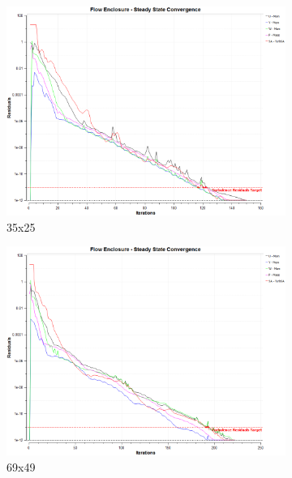 \begin{figure}[ht!]
    \centering
    \begin{subfigure}{0.48\textwidth}
        \includegraphics[width=\textwidth]{./figs/flatnx/35x25_conv.png}
        \caption{35x25}
    \end{subfigure}
    \hfill
    \begin{subfigure}{0.48\textwidth}
        \includegraphics[width=\textwidth]{./figs/flatnx/69x49_conv.png}
        \caption{69x49}
    \end{subfigure}
    \\
    \begin{subfigure}{0.48\textwidth}

\end{subfigure}
\end{figure}
